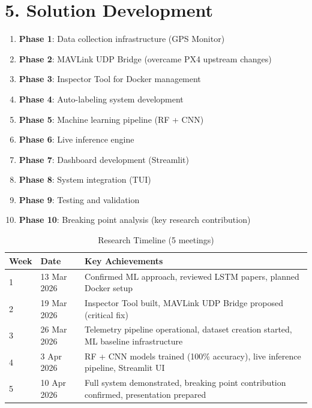 \section{5. Solution Development}

\begin{enumerate}
    \item \textbf{Phase 1}: Data collection infrastructure (GPS Monitor)
    \item \textbf{Phase 2}: MAVLink UDP Bridge (overcame PX4 upstream changes)
    \item \textbf{Phase 3}: Inspector Tool for Docker management
    \item \textbf{Phase 4}: Auto-labeling system development
    \item \textbf{Phase 5}: Machine learning pipeline (RF + CNN)
    \item \textbf{Phase 6}: Live inference engine
    \item \textbf{Phase 7}: Dashboard development (Streamlit)
    \item \textbf{Phase 8}: System integration (TUI)
    \item \textbf{Phase 9}: Testing and validation
    \item \textbf{Phase 10}: Breaking point analysis (key research contribution)
\end{enumerate}

\begin{table}[H]
    \centering
    \caption{Research Timeline (5 meetings)}
    \label{tab:timeline}
    \begin{tabular}{|p{2cm}|p{3cm}|p{8cm}|}
        \hline
        \textbf{Week} & \textbf{Date} & \textbf{Key Achievements} \\
        \hline
        1 & 13 Mar 2026 & Confirmed ML approach, reviewed LSTM papers, planned Docker setup \\
        \hline
        2 & 19 Mar 2026 & Inspector Tool built, MAVLink UDP Bridge proposed (critical fix) \\
        \hline
        3 & 26 Mar 2026 & Telemetry pipeline operational, dataset creation started, ML baseline infrastructure \\
        \hline
        4 & 3 Apr 2026 & RF + CNN models trained (100\% accuracy), live inference pipeline, Streamlit UI \\
        \hline
        5 & 10 Apr 2026 & Full system demonstrated, breaking point contribution confirmed, presentation prepared \\
        \hline
    \end{tabular}
\end{table}


